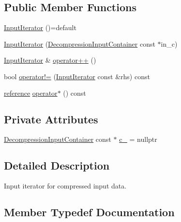\subsection*{Public Member Functions}
\begin{DoxyCompactItemize}
\item 
\hyperlink{structvt_1_1util_1_1json_1_1_input_iterator_a62d85ae4d87d2fc677c384fb0debfb2a}{Input\+Iterator} ()=default
\item 
\hyperlink{structvt_1_1util_1_1json_1_1_input_iterator_af09c946a493856653ba6c790b35d9e33}{Input\+Iterator} (\hyperlink{structvt_1_1util_1_1json_1_1_decompression_input_container}{Decompression\+Input\+Container} const $\ast$in\+\_\+c)
\item 
\hyperlink{structvt_1_1util_1_1json_1_1_input_iterator}{Input\+Iterator} \& \hyperlink{structvt_1_1util_1_1json_1_1_input_iterator_af098fb45d489bf7213638f814204d1cd}{operator++} ()
\item 
bool \hyperlink{structvt_1_1util_1_1json_1_1_input_iterator_a12d5ee7bb678281ddbd8bda5d09b881f}{operator!=} (\hyperlink{structvt_1_1util_1_1json_1_1_input_iterator}{Input\+Iterator} const \&rhs) const
\item 
\hyperlink{structvt_1_1util_1_1json_1_1_input_iterator_ac178e9ca2ff42160d54fd0b9080c1d40}{reference} \hyperlink{structvt_1_1util_1_1json_1_1_input_iterator_a609b10dde4627f8a0bf5211eaf87210b}{operator$\ast$} () const
\end{DoxyCompactItemize}
\subsection*{Private Attributes}
\begin{DoxyCompactItemize}
\item 
\hyperlink{structvt_1_1util_1_1json_1_1_decompression_input_container}{Decompression\+Input\+Container} const  $\ast$ \hyperlink{structvt_1_1util_1_1json_1_1_input_iterator_aabe22e55b250f758b86079a40c62be5f}{c\+\_\+} = nullptr
\end{DoxyCompactItemize}


\subsection{Detailed Description}
Input iterator for compressed input data. 

\subsection{Member Typedef Documentation}
\mbox{\label{structvt_1_1util_1_1json_1_1_input_iterator_ade8dadafc1ee3baa8ebf11bcfbb1efd4}} 
